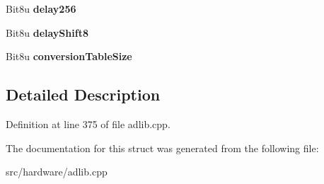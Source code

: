 \begin{DoxyCompactItemize}
\item 
\hypertarget{structAdlib_1_1RawHeader_a1fd40a8fe5a9771c58e969db0a9e0386}{Bit8u {\bfseries delay256}}\label{structAdlib_1_1RawHeader_a1fd40a8fe5a9771c58e969db0a9e0386}

\item 
\hypertarget{structAdlib_1_1RawHeader_a73598973dbc467633ad076135d19223a}{Bit8u {\bfseries delay\-Shift8}}\label{structAdlib_1_1RawHeader_a73598973dbc467633ad076135d19223a}

\item 
\hypertarget{structAdlib_1_1RawHeader_a11b787b47fad2e30661ff1846811c823}{Bit8u {\bfseries conversion\-Table\-Size}}\label{structAdlib_1_1RawHeader_a11b787b47fad2e30661ff1846811c823}

\end{DoxyCompactItemize}


\subsection{Detailed Description}


Definition at line 375 of file adlib.\-cpp.



The documentation for this struct was generated from the following file\-:\begin{DoxyCompactItemize}
\item 
src/hardware/adlib.\-cpp\end{DoxyCompactItemize}

